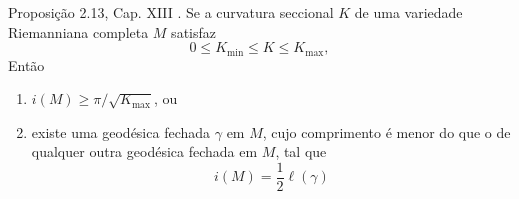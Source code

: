 \begin{exercise}
Proposição 2.13, Cap. XIII \cite{doc}. Se a curvatura seccional $K$ de uma
variedade Riemanniana completa $M$ satisfaz
$$
0\leq K_{\operatorname{min}}\leq K\leq K_{\operatorname{max}},
$$
Então
\begin{enumerate}
\item $i(M) \geq \pi/\sqrt{K_{\operatorname{max}}}$, ou
\item existe uma geodésica fechada $\gamma$ em $M$, cujo comprimento é menor do 
que o de qualquer outra geodésica fechada em $M$, tal que
$$
i(M)=\frac{1}{2}\ell(\gamma)
$$

\end{enumerate}
\end{exercise}


